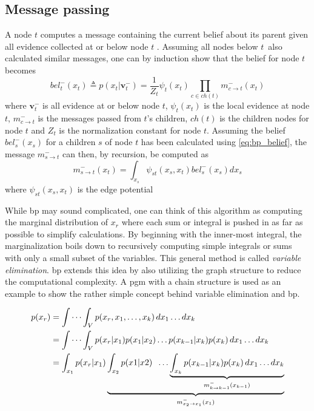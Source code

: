 \subsection{Message passing}
A node $t$ computes a message containing the current belief about its parent given all evidence collected at or below node $t$ \cite{murphy}. Assuming all nodes below $t$ also calculated similar messages, one can by induction show that the belief for node $t$ becomes
\begin{equation}\label{eq:bp_belief}
    bel_t^-(x_t) \triangleq p(x_t | \mathbf{v}_t^-) = \frac{1}{Z_t}\psi_t(x_t) \prod_{c \in ch(t)} m_{c\to t}^-(x_t)
\end{equation}
where $\mathbf{v}_t^-$ is all evidence at or below node $t$, $\psi_t(x_t)$ is the local evidence at node $t$, $m_{c \to t}^-$ is the messages passed from $t$'s children, $ch(t)$ is the children nodes for node $t$ and $Z_t$ is the normalization constant for node $t$.
Assuming the belief $bel_s^-(x_s)$ for a children $s$ of node $t$ has been calculated using \cref{eq:bp_belief},  the message $m_{s\to t}^-$ can then, by recursion, be computed as
\begin{equation}\label{eq:bp_message}
    m_{s \to t}^-(x_t) = \int_{x_s} \psi_{st}(x_s, x_t) bel_s^-(x_s) dx_s
\end{equation}
where $\psi_{st}(x_s, x_t)$ is the edge potential %

While \acrshort{bp} may sound complicated, one can think of this algorithm as computing the marginal distribution of $x_r$ where each sum or integral is pushed in as far as possible to simplify calculations. By beginning with the inner-most integral, the marginalization boils down to recursively computing simple integrals or sums with only a small subset of the variables. This general method is called \textit{variable elimination}\cite{murphy}. \acrshort{bp} extends this idea by also utilizing the graph structure to reduce the computational complexity. A \acrshort{pgm} with a chain structure is used as an example to show the rather simple concept behind variable elimination and \acrshort{bp}.

\begin{subequations}
\begin{align}
p(x_r) &= \idotsint_V p(x_r, x_1,\dots,x_k) \,dx_1 \dots dx_k\\
&= \idotsint_V p(x_r | x_1)p(x_1|x_2)\dots p(x_{k-1} | x_k)p(x_k) \, dx_1 \dots dx_k\\
&= \int_{x_1} p(x_r | x_1)\underbrace{\int_{x_2}p(x1 | x2) \; \;  \dots \underbrace{\int_{x_k} p(x_{k-1} | x_k)p(x_k) \, dx_1 \dots dx_k}_{m_{k\to k-1}^-(x_{k-1})}}_{m_{x_2 \to x_1}^-(x_1)}
\end{align}
\end{subequations}

